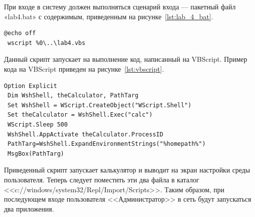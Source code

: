 При входе в систему должен выполняться сценарий входа ---
пакетный файл «lab4.bat» с содержимым, приведенным на рисунке~\ref{lst:lab_4_bat}.
\begin{lstlisting}[caption={Содержимое файла <<lab4.bat>>},
label=lst:lab_4_bat]
 @echo off
 wscript %0\..\lab4.vbs
\end{lstlisting}

Данный скрипт запускает на выполнение код, написанный на VBScript. Пример кода
на VBScript приведен на рисунке~\ref{lst:vbscript}.
\begin{lstlisting}[caption={Содержимое файла <<lab4.bat>>},
label=lst:lab_4_bat]
 Option Explicit
 Dim WshShell, theCalculator, PathTarg
 Set WshShell = WScript.CreateObject("WScript.Shell")
 Set theCalculator = WshShell.Exec("calc")
 WScript.Sleep 500
 WshShell.AppActivate theCalculator.ProcessID
 PathTarg=WshShell.ExpandEnvironmentStrings("%homepath%")
 MsgBox(PathTarg)
\end{lstlisting}

Приведенный скрипт запускает калькулятор и выводит на экран настройки среды
пользователя. Теперь следует поместить эти два файла в каталог <<c://windows/system32/Repl/Import/Scripts>>.
Таким образом, при последующем входе пользователя <<Администратор>> в сеть
будут запускаться два приложения.
